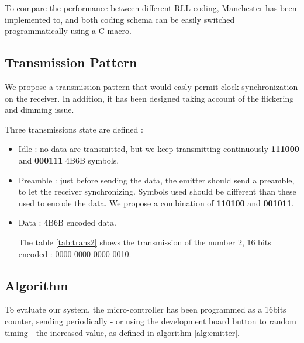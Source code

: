 To compare the performance between different RLL coding, Manchester has been implemented to, and both coding schema can be easily switched programmatically using a C macro.

\subsection{Transmission Pattern} \label{frame}

We propose a transmission pattern that would easly permit clock synchronization on the receiver. In addition, it has been designed taking account of the flickering and dimming issue.

Three transmissions state are defined : 
\begin{itemize}
\item Idle : no data are transmitted, but we keep transmitting continuously \textbf{111000} and \textbf{000111} 4B6B symbols.
\item Preamble : just before sending the data, the emitter should send a preamble, to let the receiver synchronizing. Symbols used should be different than these used to encode the data. We propose a combination of \textbf{110100} and \textbf{001011}.
\item Data : 4B6B encoded data.

The table \ref{tab:trans2} shows the transmission of the number 2, 16 bits encoded : 0000 0000 0000 0010.

\begin{table}[htbp]
  \begin{center}
  \end{center}
  \caption{A transmission example : 2 (16-bits)}
  \label{tab:trans2}
\end{table}


\end{itemize}
\subsection{Algorithm}
To evaluate our system, the micro-controller has been programmed as a 16bits counter, sending periodically - or using the development board button to random timing - the increased value, as defined in algorithm \ref{alg:emitter}.

